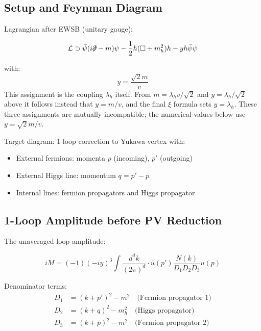 	\subsection{Setup and Feynman Diagram}
	
	Lagrangian after EWSB (unitary gauge):
	
	\begin{equation}
		\mathcal{L} \supset \bar{\psi}(i\slashed{\partial} - m)\psi - \frac{1}{2}h(\Box + m_h^2)h - y h \bar{\psi}\psi
	\end{equation}
	
	with:
	\begin{equation}
		y = \frac{\sqrt{2} m}{v}
	\end{equation}
	This assignment is the coupling $\lambda_h$ itself. From $m = \lambda_h v/\sqrt{2}$ and $y = \lambda_h/\sqrt{2}$ above it follows instead that $y = m/v$, and the final $\xi$ formula sets $y = \lambda_h$. These three assignments are mutually incompatible; the numerical values below use $y = \sqrt{2}m/v$.
	
	Target diagram: 1-loop correction to Yukawa vertex with:
	\begin{itemize}
		\item External fermions: momenta $p$ (incoming), $p'$ (outgoing)
		\item External Higgs line: momentum $q = p' - p$
		\item Internal lines: fermion propagators and Higgs propagator
	\end{itemize}
	
	\subsection{1-Loop Amplitude before PV Reduction}
	
	The unaveraged loop amplitude:
	
	\begin{equation}
		iM = (-1)(-iy)^3 \int \frac{d^d k}{(2\pi)^d} \cdot \bar{u}(p') \frac{N(k)}{D_1 D_2 D_3} u(p)
	\end{equation}
	
	Denominator terms:
	\begin{align}
		D_1 &= (k + p')^2 - m^2 \quad \text{(Fermion propagator 1)}\\
		D_2 &= (k + q)^2 - m_h^2 \quad \text{(Higgs propagator)}\\
		D_3 &= (k + p)^2 - m^2 \quad \text{(Fermion propagator 2)}
	\end{align}
	
